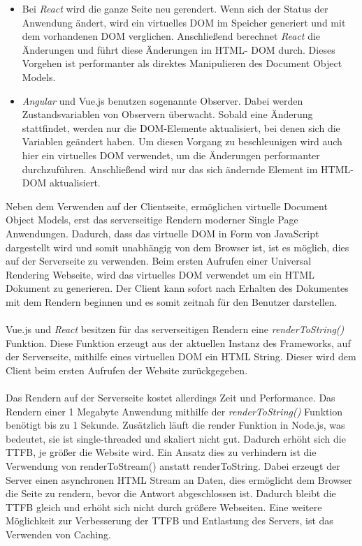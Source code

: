 \documentclass[runningheads]{llncs}
\numberwithin{figure}{section}
\begin{document}
\begin{itemize}
  \setlength\itemsep{1em}
  \item Bei \textit{React} wird die ganze Seite neu gerendert. 
  Wenn sich der Status der Anwendung ändert, 
  wird ein virtuelles DOM im Speicher generiert 
  und mit dem vorhandenen DOM verglichen. 
  Anschließend berechnet \textit{React} die Änderungen und führt diese 
  Änderungen im HTML- DOM durch. 
  Dieses Vorgehen ist performanter als direktes Manipulieren 
  des Document Object Models.

  \item \textit{Angular} und Vue.js benutzen sogenannte Observer. 
  Dabei werden  Zustandsvariablen von Observern überwacht. 
  Sobald eine Änderung stattfindet, 
  werden nur die DOM-Elemente aktualisiert, 
  bei denen sich die Variablen geändert haben. 
  Um diesen Vorgang zu beschleunigen 
  wird auch hier ein virtuelles DOM verwendet, 
  um die Änderungen performanter durchzuführen. 
  Anschließend wird nur das sich ändernde Element im HTML- DOM aktualisiert.
\end{itemize}
Neben dem Verwenden auf der Clientseite, 
ermöglichen virtuelle Document Object Models, 
erst das serverseitige Rendern moderner Single Page Anwendungen. 
Dadurch, dass das virtuelle DOM in Form von JavaScript dargestellt wird und 
somit unabhängig von dem Browser ist, 
ist es möglich, dies auf der Serverseite zu verwenden. 
Beim ersten Aufrufen einer Universal Rendering Webseite, 
wird das virtuelles DOM verwendet um ein HTML Dokument zu generieren. 
Der Client kann sofort nach Erhalten des Dokumentes mit dem Rendern beginnen und 
es somit zeitnah für den Benutzer darstellen. \cite{krajka_2015}
\\
\\
Vue.js und \textit{React} besitzen für das serverseitigen Rendern eine \textit{renderToString()} Funktion. 
Diese Funktion erzeugt aus der aktuellen Instanz des Frameworks, 
auf der Serverseite, 
mithilfe eines virtuellen DOM ein HTML String. 
Dieser wird dem Client beim ersten Aufrufen der Website zurückgegeben.
\\
\\
Das Rendern auf der Serverseite kostet allerdings Zeit und Performance. 
Das Rendern einer 1 Megabyte Anwendung mithilfe der \textit{renderToString() }
Funktion benötigt bis zu 1 Sekunde. 
Zusätzlich läuft die render Funktion in Node.js, 
was bedeutet, sie ist single-threaded und skaliert nicht gut. 
Dadurch erhöht sich die TTFB, je größer die Website wird. 
Ein Ansatz dies zu verhindern ist die Verwendung von renderToStream() anstatt renderToString. 
Dabei erzeugt der Server einen asynchronen HTML Stream an Daten, 
dies ermöglicht dem Browser die Seite zu rendern, 
bevor die Antwort abgeschlossen ist. 
Dadurch bleibt die TTFB gleich und 
erhöht sich nicht durch größere Webseiten. 
Eine weitere Möglichkeit zur Verbesserung der TTFB und Entlastung des Servers, 
ist das Verwenden von Caching.
\end{document}
